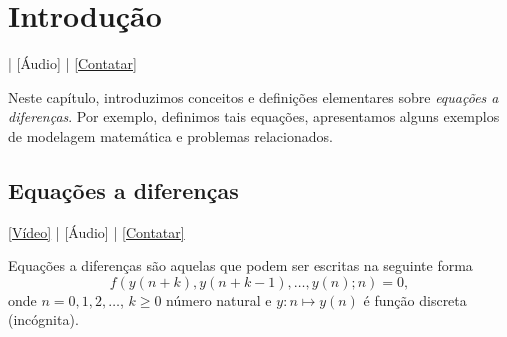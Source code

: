 
\chapter{Introdução}\label{cap_intro}

\begin{flushright}
  [Vídeo] | [Áudio] | \href{https://phkonzen.github.io/notas/contato.html}{[Contatar]}
\end{flushright}

Neste capítulo, introduzimos conceitos e definições elementares sobre \emph{equações a diferenças}. Por exemplo, definimos tais equações, apresentamos alguns exemplos de modelagem matemática e problemas relacionados.

\section{Equações a diferenças}\label{cap_intro_sec_ead}

\begin{flushright}
  \href{https://archive.org/details/ead-intro}{[Vídeo]} | [Áudio] | \href{https://phkonzen.github.io/notas/contato.html}{[Contatar]}
\end{flushright}

Equações a diferenças são aquelas que podem ser escritas na seguinte forma
\begin{equation}\label{eq:intro_ead}
  f\left(y(n+k),y(n+k-1),\dotsc,y(n);n\right) = 0,
\end{equation}
onde $n=0, 1, 2, \ldots$, $k\geq 0$ número natural e $y:n\mapsto y(n)$ é função discreta (incógnita).

